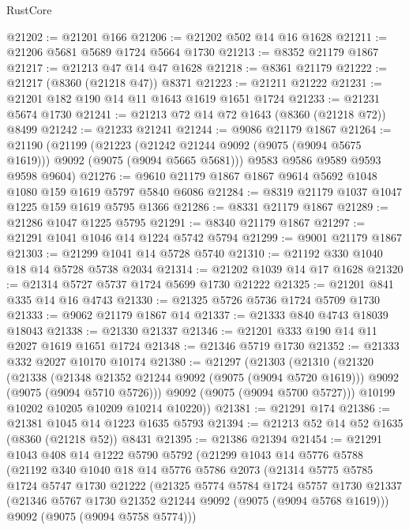 \begin{lexlean}{RustCore}
\begin{coremodule}
@21202 := @21201 @166
@21206 := @21202 @502 @14 @16 @1628
@21211 := @21206 @5681 @5689 @1724 @5664 @1730
@21213 := @8352 @21179 @1867
@21217 := @21213 @47 @14 @47 @1628
@21218 := @8361 @21179
@21222 := @21217 (@8360 (@21218 @47)) @8371
@21223 := @21211 @21222
@21231 := @21201 @182 @190 @14 @11 @1643 @1619 @1651 @1724
@21233 := @21231 @5674 @1730
@21241 := @21213 @72 @14 @72 @1643 (@8360 (@21218 @72)) @8499
@21242 := @21233 @21241
@21244 := @9086 @21179 @1867
@21264 := @21190
    (@21199
      (@21223 (@21242 @21244 @9092 (@9075 (@9094 @5675 @1619))) @9092 (@9075 (@9094 @5665 @5681)))
      @9583
      @9586
      @9589
      @9593
      @9598
      @9604)
@21276 := @9610 @21179 @1867 @1867 @9614 @5692 @1048 @1080 @159 @1619 @5797 @5840 @6086
@21284 := @8319 @21179 @1037 @1047 @1225 @159 @1619 @5795 @1366
@21286 := @8331 @21179 @1867
@21289 := @21286 @1047 @1225 @5795
@21291 := @8340 @21179 @1867
@21297 := @21291 @1041 @1046 @14 @1224 @5742 @5794
@21299 := @9001 @21179 @1867
@21303 := @21299 @1041 @14 @5728 @5740
@21310 := @21192 @330 @1040 @18 @14 @5728 @5738 @2034
@21314 := @21202 @1039 @14 @17 @1628
@21320 := @21314 @5727 @5737 @1724 @5699 @1730 @21222
@21325 := @21201 @841 @335 @14 @16 @4743
@21330 := @21325 @5726 @5736 @1724 @5709 @1730
@21333 := @9062 @21179 @1867 @14
@21337 := @21333 @840 @4743 @18039 @18043
@21338 := @21330 @21337
@21346 := @21201 @333 @190 @14 @11 @2027 @1619 @1651 @1724
@21348 := @21346 @5719 @1730
@21352 := @21333 @332 @2027 @10170 @10174
@21380 := @21297
    (@21303
      (@21310
        (@21320
          (@21338
            (@21348 @21352 @21244 @9092 (@9075 (@9094 @5720 @1619)))
            @9092
            (@9075 (@9094 @5710 @5726)))
          @9092
          (@9075 (@9094 @5700 @5727)))
        @10199
        @10202
        @10205
        @10209
        @10214
        @10220))
@21381 := @21291 @174
@21386 := @21381 @1045 @14 @1223 @1635 @5793
@21394 := @21213 @52 @14 @52 @1635 (@8360 (@21218 @52)) @8431
@21395 := @21386 @21394
@21454 := @21291
    @1043
    @408
    @14
    @1222
    @5790
    @5792
    (@21299
      @1043
      @14
      @5776
      @5788
      (@21192
        @340
        @1040
        @18
        @14
        @5776
        @5786
        @2073
        (@21314
          @5775
          @5785
          @1724
          @5747
          @1730
          @21222
          (@21325
            @5774
            @5784
            @1724
            @5757
            @1730
            @21337
            (@21346 @5767 @1730 @21352 @21244 @9092 (@9075 (@9094 @5768 @1619)))
            @9092
            (@9075 (@9094 @5758 @5774)))

\end{coremodule}
\end{lexlean}
